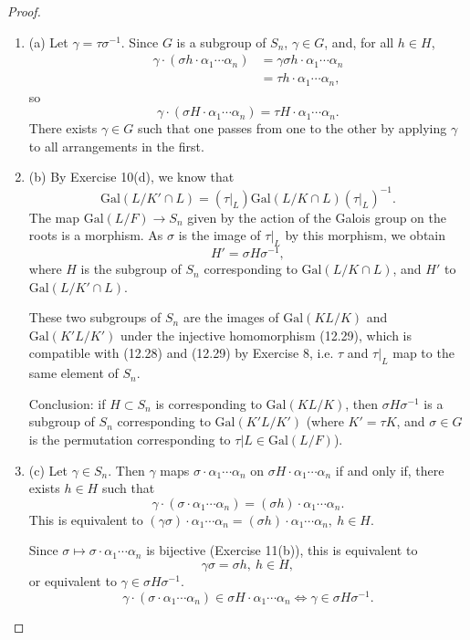 \documentclass[11pt,a4paper]{article}
\newcommand{\be} {\begin{enumerate}}
\newcommand{\ee} {\end{enumerate}}
\newcommand{\Gal}{\mathrm{Gal}}
\begin{document}
\begin{proof}
\be
\item[(a)] Let $\gamma = \tau \sigma^{-1}$. Since $G$ is a subgroup of $S_n$, $\gamma \in G$, and, for all $h \in H$,
\begin{align*}
\gamma \cdot (\sigma h \cdot \alpha_1\cdots \alpha_n) &= \gamma \sigma h \cdot \alpha_1\cdots \alpha_n\\
&= \tau h \cdot \alpha_1\cdots \alpha_n,
\end{align*}
so 
$$ \gamma \cdot (\sigma H \cdot \alpha_1\cdots \alpha_n) =\tau H \cdot \alpha_1\cdots \alpha_n.$$
There exists $\gamma \in G$ such that one passes from one to the other by applying $\gamma$ to all arrangements in the first.

\item[(b)] By Exercise 10(d), we know that
$$\Gal(L/K' \cap L) = (\tau \vert_L) \Gal(L/K\cap L) (\tau \vert _L)^{-1}.$$
The map $\Gal(L/F) \to S_n$ given by the action of the Galois group on the roots is a morphism. As $\sigma$ is the image of $\tau\vert_ L$ by this morphism, we obtain
$$H' = \sigma H \sigma^{-1},$$
where $H$ is the subgroup of $S_n$ corresponding to ${\Gal(L/K\cap L) }$, and $H'$ to ${\Gal(L/K' \cap L)}$.

These two subgroups of $S_n$ are the images of $\Gal(KL/K)$ and $\Gal(K'L/K')$ under the injective homomorphism (12.29), which is compatible with (12.28) and (12.29) by Exercise 8, i.e. $\tau$ and $\tau\vert_L$ map to the same element of $S_n$.

Conclusion: if $H\subset S_n$ is corresponding to $\Gal(KL/K)$, then $\sigma H \sigma^{-1}$ is a subgroup of $S_n$ corresponding to $\Gal(K'L/K')$ (where $K' = \tau K$, and $\sigma \in G$ is the permutation corresponding to $\tau\vert L \in \Gal(L/F)$).

\item[(c)] 
Let $\gamma \in S_n$. Then $\gamma$ maps $\sigma\cdot \alpha_1\cdots \alpha_n$ on $\sigma H\cdot \alpha_1\cdots\alpha_n $ if and only if, there exists $h \in H$ such that
$$\gamma \cdot(\sigma\cdot \alpha_1\cdots \alpha_n) = (\sigma h) \cdot \alpha_1\cdots\alpha_n.$$
This is equivalent to  $(\gamma \sigma)\cdot \alpha_1\cdots \alpha_n = (\sigma h) \cdot \alpha_1\cdots\alpha_n,\ h\in H$.

Since $\sigma \mapsto \sigma\cdot \alpha_1\cdots \alpha_n$ is bijective (Exercise 11(b)), this is equivalent to
$$\gamma \sigma = \sigma h,\  h \in H,$$
or equivalent to $\gamma \in \sigma H \sigma^{-1}.$
$$\gamma \cdot(\sigma\cdot \alpha_1\cdots \alpha_n) \in \sigma H\cdot \alpha_1\cdots\alpha_n  \iff \gamma \in \sigma H \sigma^{-1}.$$
\ee
\end{proof}
\end{document}
